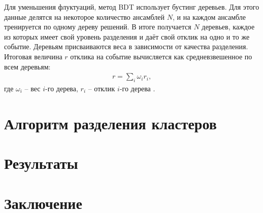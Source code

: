 \documentclass[14pt]{extarticle}
\begin{document}
Для уменьшения флуктуаций, метод BDT использует бустинг деревьев. Для этого данные делятся на некоторое количество ансамблей $N$, и на каждом ансамбле тренируется по одному дереву решений. В итоге получается $N$ деревьев, каждое из которых имеет свой уровень разделения и даёт свой отклик на одно и то же событие. Деревьям присваиваются веса в зависимости от качества разделения. Итоговая величина $r$ отклика на событие вычисляется как средневзвешенное по всем деревьям:
\begin{align*}
r = \sum_i \omega_i r_i,
\end{align*}
где $\omega_i$ -- вес $i$-го дерева, $r_i$ -- отклик $i$-го дерева \cite{tmva4}.
\section{Алгоритм разделения кластеров}

\section{Результаты}
\section{Заключение}




\end{document}
